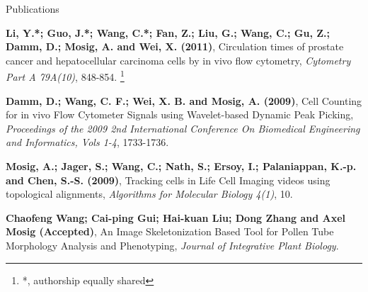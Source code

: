 \begin{wcfChaps}{Publications}






\textbf{Li, Y.*; Guo, J.*; Wang, C.*; Fan, Z.; Liu, G.; Wang, C.; Gu, Z.; Damm, D.; Mosig, A. and Wei, X. (2011)}, Circulation times of prostate cancer and hepatocellular carcinoma cells by in vivo flow cytometry, \emph{Cytometry Part A 79A(10)}, 848-854. \footnote{ *, authorship equally shared}

\textbf{Damm, D.; Wang, C. F.; Wei, X. B. and Mosig, A. (2009)}, Cell Counting for in vivo Flow Cytometer Signals using Wavelet-based Dynamic Peak Picking, \emph{Proceedings of the 2009 2nd International Conference On Biomedical Engineering and Informatics, Vols 1-4}, 1733-1736.

\textbf{Mosig, A.; Jager, S.; Wang, C.; Nath, S.; Ersoy, I.; Palaniappan, K.-p. and Chen, S.-S. (2009)}, Tracking cells in Life Cell Imaging videos using topological alignments, \emph{Algorithms for Molecular Biology 4(1)}, 10.

\textbf{Chaofeng Wang; Cai-ping Gui; Hai-kuan Liu; Dong Zhang and Axel Mosig (Accepted)}, An Image Skeletonization Based Tool for Pollen Tube Morphology Analysis and Phenotyping, \emph{Journal of Integrative Plant Biology}.

\end{wcfChaps}

